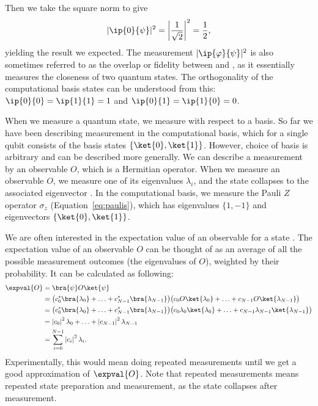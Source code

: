 \documentclass[a4paper,10pt]{article}
\begin{document}
Then we take the square norm to give
\begin{equation}
\lvert \ip{0}{\psi} \rvert^2 = \left\lvert \dfrac{1}{\sqrt2} \right\rvert^2 = \dfrac{1}{2},
\end{equation}
yielding the result we expected.
The measurement $\lvert\ip{\varphi}{\psi}\rvert^2$ is also sometimes referred to as the overlap or fidelity between \ket{\psi} and \ket{\varphi}, as it essentially measures the closeness of two quantum states.
The orthogonality of the computational basis states can be understood from this: $\ip{0}{0} = \ip{1}{1} = 1$ and $\ip{0}{1} = \ip{1}{0} = 0$.

When we measure a quantum state, we measure with respect to a basis.
So far we have been describing measurement in the computational basis, which for a single qubit consists of the basis states $\{\ket{0}, \ket{1}\}$.
However, choice of basis is arbitrary and can be described more generally.
We can describe a measurement by an observable $O$, which is a Hermitian operator.
When we measure an observable $O$, we measure one of its eigenvalues $\lambda_i$, and the state collapses to the associated eigenvector .
In the computational basis, we measure the Pauli $Z$ operator $\sigma_z$ (Equation~\ref{eq:paulis}), which has eigenvalues $\{1, -1\}$ and eigenvectors $\{\ket{0}, \ket{1}\}$.

We are often interested in the expectation value of an observable for a state \ket{\psi}.
The expectation value  of an observable $O$ can be thought of as an average of all the possible measurement outcomes (the eigenvalues of $O$), weighted by their probability.
It can be calculated as following:
\begin{equation}
\begin{aligned}
\expval{O} &= \bra{\psi}O\ket{\psi} \\
&= \big(c_0^*\bra{\lambda_0} + \ldots + c_{N-1}^*\bra{\lambda_{N-1}}\big) \big(c_0O\ket{\lambda_0} + \ldots + c_{N-1}O\ket{\lambda_{N-1}}\big) \\
&= \big(c_0^*\bra{\lambda_0} + \ldots + c_{N-1}^*\bra{\lambda_{N-1}}\big) \big(c_0\lambda_0\ket{\lambda_0} + \ldots + c_{N-1}\lambda_{N-1}\ket{\lambda_{N-1}}\big) \\
&=  \left\lvert c_0\right\rvert^2\lambda_0 + \ldots + \left\lvert c_{N-1}\right\rvert^2 \lambda_{N-1} \\
&= \sum_{i=0}^{N-1} \left\lvert c_i\right\rvert^2\lambda_i.
\end{aligned}
\end{equation}
Experimentally, this would mean doing repeated measurements until we get a good approximation of $\expval{O}$.
Note that repeated measurements means repeated state preparation and measurement, as the state collapses after measurement.
\end{document}
